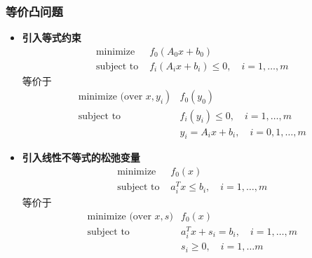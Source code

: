 \documentclass[handout]{beamer}
\begin{document}
	\begin{frame}
		\frametitle{等价凸问题}
		\begin{itemize}[<+->]
			\item \textbf{引入等式约束}
			\begin{equation}
				\begin{array}{ll}
					\text{ minimize } & f_{0}\left(A_{0} x+b_{0}\right) \\
					\text { subject to } & f_{i}\left(A_{i} x+b_{i}\right) \leq 0, \quad i=1, \ldots, m
				\end{array}
			\end{equation}
			等价于
			\begin{equation}
				\begin{array}{ll}
					\text { minimize (over } \left.x, y_{i}\right) & f_{0}\left(y_{0}\right) \\
					\text { subject to } & f_{i}\left(y_{i}\right) \leq 0, \quad i=1, \ldots, m \\
					& y_{i}=A_{i} x+b_{i}, \quad i=0,1, \ldots, m
				\end{array}
			\end{equation}
			
			\item \textbf{引入线性不等式的松弛变量}
			\begin{equation}
				\begin{array}{ll}
					\text { minimize } & f_{0}(x) \\
					\text { subject to } & a_{i}^{T} x \leq b_{i}, \quad i=1, \ldots, m
				\end{array}
			\end{equation}
			等价于
			\begin{equation}
				\begin{array}{ll}
					\text { minimize (over } x, s) & f_{0}(x) \\
					\text { subject to } & a_{i}^{T} x+s_{i}=b_{i}, \quad i=1, \ldots, m \\
					& s_{i} \geq 0, \quad i=1, \ldots m
				\end{array}
			\end{equation}
		\end{itemize}
	\end{frame}
\end{document}
